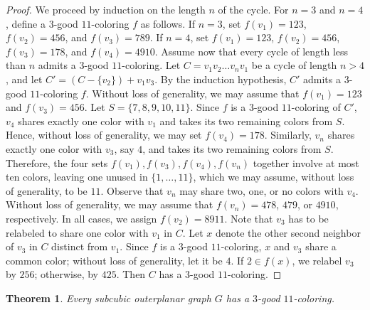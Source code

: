 \documentclass[12pt]{article}
\newtheorem{theorem}{Theorem}
\numberwithin{theorem}{section}
\numberwithin{conjecture}{section}
\numberwithin{corollary}{section}
\numberwithin{example}{section}
\numberwithin{lemma}{section}
\numberwithin{proposition}{section}
\numberwithin{problem}{section}
\numberwithin{remark}{section}
\numberwithin{claim}{theorem}
\numberwithin{definition}{section}
\begin{document}
\begin{proof}
We proceed by induction on the length $n$ of the cycle. For $n=3$ and $n=4$, define a $3$-good $11$-coloring $f$ as follows. If $n=3$, set $f(v_1)=123$, $f(v_2)=456$, and $f(v_3)=789$. If $n=4$, set $f(v_1)=123$, $f(v_2)=456$, $f(v_3)=178$, and $f(v_4)=4910$.
\noindent Assume now that every cycle of length less than $n$ admits a $3$-good $11$-coloring. Let $C = v_1v_2\ldots v_nv_1$ be a cycle of length $n>4$, and let $C' = (C - \{v_2\}) + v_1v_3$. By the induction hypothesis, $C'$ admits a $3$-good $11$-coloring $f$. Without loss of generality, we may assume that $f(v_1)=123$ and $f(v_3)=456$. Let $S=\{7,8,9,10,11\}$. Since $f$ is a $3$-good $11$-coloring of $C'$, $v_4$ shares exactly one color with $v_1$ and takes its two remaining colors from $S$. Hence, without loss of generality, we may set $f(v_4) = 178$. Similarly, $v_n$ shares exactly one color with $v_3$, say $4$, and takes its two remaining colors from $S$. Therefore, the four sets $f(v_1), f(v_3), f(v_4), f(v_n)$ together involve at most ten colors, leaving one unused in $\{1,\ldots, 11\}$, which we may assume, without loss of generality, to be $11$. Observe that $v_n$ may share two, one, or no colors with $v_4$. Without loss of generality, we may assume that $f(v_n) = 478$, $479$, or $4910$, respectively. In all cases, we assign $f(v_2) = 8911$. Note that $v_3$ has to be relabeled to share one color with $v_1$ in $C$. Let $x$ denote the other second neighbor of $v_3$ in $C$ distinct from $v_1$. Since $f$ is a $3$-good $11$-coloring, $x$ and $v_3$ share a common color; without loss of generality, let it be $4$. If $2\in f(x)$, we relabel $v_3$ by $256$; otherwise, by $425$. Then $C$ has a $3$-good $11$-coloring.\end{proof}

\begin{theorem}
    Every subcubic outerplanar graph $G$ has a $3$-good $11$-coloring.
\end{theorem}
 
\end{document}
